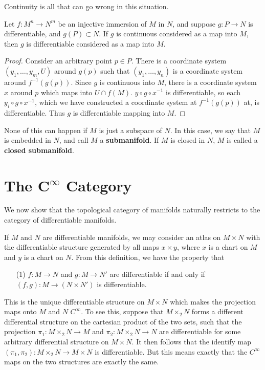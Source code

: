 Continuity is all that can go wrong in this situation.

\begin{theorem}
    Let $f:M^n \to N^m$ be an injective immersion of $M$ in $N$, and suppose $g: P \to N$ is differentiable, and $g(P) \subset N$. If $g$ is continuous considered as a map into $M$, then $g$ is differentiable considered as a map into $M$.
\end{theorem}
\begin{proof}
    Consider an arbitrary point $p \in P$. There is a coordinate system $(y_1, \dots, y_m,U)$ around $g(p)$ such that $(y_1, \dots, y_n)$ is a coordinate system around $f^{-1}(g(p))$. Since $g$ is continuous into $M$, there is a coordinate system $x$ around $p$ which maps into $U \cap f(M)$. $y \circ g \circ x^{-1}$ is differentiable, so each $y_i \circ g \circ x^{-1}$, which we have constructed a coordinate system at $f^{-1}(g(p))$ at, is differentiable. Thus $g$ is differentiable mapping into $M$.
\end{proof}

None of this can happen if $M$ is just a subspace of $N$. In this case, we say that $M$ is embedded in $N$, and call $M$ a {\bf submanifold}. If $M$ is closed in $N$, $M$ is called a {\bf closed submanifold}.

\section{The $\mathbf{C^\infty}$ Category}

We now show that the topological category of manifolds naturally restricts to the category of differentiable manifolds.

\begin{example}
    If $M$ and $N$ are differentiable manifolds, we may consider an atlas on $M \times N$ with the differentiable structure generated by all maps $x \times y$, where $x$ is a chart on $M$ and $y$ is a chart on $N$. From this definition, we have the property that
    \begin{enumerate}
        \item[(1)] $f:M \to N$ and $g:M \to N'$ are differentiable if and only if $(f,g) : M \to (N \times N')$ is differentiable.
    \end{enumerate}
    This is the unique differentiable structure on $M \times N$ which makes the projection maps onto $M$ and $N$ $C^\infty$. To see this, suppose that $M \times_2 N$ forms a different differential structure on the cartesian product of the two sets, such that the projection $\pi_1: M \times_2 N \to M$ and $\pi_2: M \times_2 N \to N$ are differentiable for some arbitrary differential structure on $M \times N$. It then follows that the identify map $(\pi_1, \pi_2) : M \times_2 N \to M \times N$ is differentiable. But this means exactly that the $C^\infty$ maps on the two structures are exactly the same.
\end{example}

